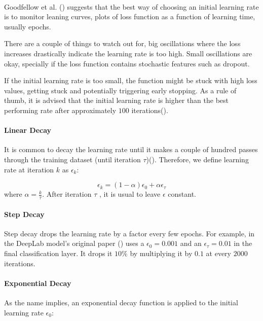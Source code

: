 \paragraph{}
Goodfellow et al. (\cite{GoodBengCour16}) suggests that the best way of choosing an initial learning rate is to monitor leaning curves, plots of loss function as a function of learning time, usually epochs. 

There are a couple of things to watch out for, big oscillations  where the loss increases drastically indicate the learning rate is too high. Small oscillations are okay, specially if the loss function contains stochastic features such as dropout. 

If the initial learning rate is too small, the function might be stuck with high loss values, getting stuck and potentially triggering early stopping. As a rule of thumb, it is advised that the initial learning rate is higher than the best performing rate after approximately $100$ iterations(\cite{GoodBengCour16}).
\paragraph{Linear Decay} 
It is common to decay the learning rate until it makes a couple of hundred passes through the training dataset (until iteration $\tau$)(\cite{GoodBengCour16}). Therefore, we define learning rate at iteration $k$ as $\epsilon_k$:

\begin{equation} \label{eq_linear_lr}
\epsilon_k = (1 - \alpha)\epsilon_0 + \alpha\epsilon_\tau
\end{equation}
where $\alpha=\frac{k}{\tau}$. After iteration $\tau$ , it is usual to leave $\epsilon$ constant.
\paragraph{Step Decay} 
Step decay drops the learning rate by a factor every few epochs. For example, in the DeepLab model's original paper (\cite{chen2016semantic}) uses a $\epsilon_0=0.001$ and an $\epsilon_\tau=0.01$ in the final classification layer. It drops it $10\%$ by multiplying it by $0.1$ at every $2000$ iterations.
\paragraph{Exponential Decay} 
As the name implies, an exponential decay function is applied to the initial learning rate $\epsilon_0$:

